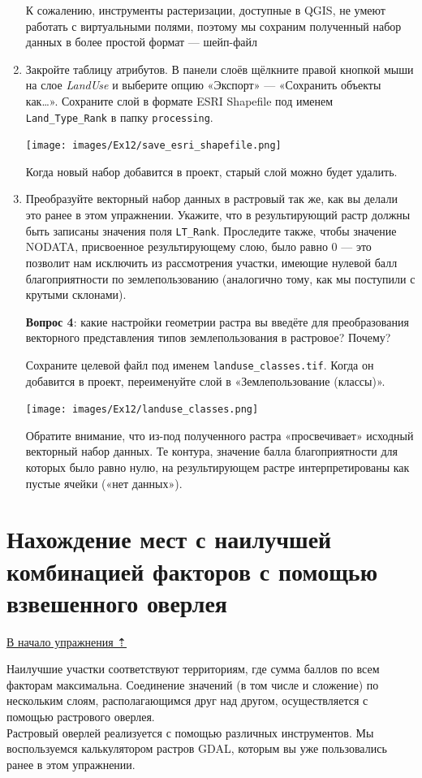 \documentclass[
  12pt,
]{book}
\begin{document}
\begin{enumerate}
  К сожалению, инструменты растеризации, доступные в QGIS, не умеют работать с виртуальными полями, поэтому мы сохраним полученный набор данных в более простой формат --- шейп-файл
\item
  Закройте таблицу атрибутов. В панели слоёв щёлкните правой кнопкой мыши на слое \emph{LandUse} и выберите опцию «Экспорт» --- «Сохранить объекты как\ldots». Сохраните слой в формате ESRI Shapefile под именем \texttt{Land\_Type\_Rank} в папку \texttt{processing}.

  \texttt{[image: images/Ex12/save\_esri\_shapefile.png]}

  Когда новый набор добавится в проект, старый слой можно будет удалить.
\item
  Преобразуйте векторный набор данных в растровый так же, как вы делали это ранее в этом упражнении. Укажите, что в результирующий растр должны быть записаны значения поля \texttt{LT\_Rank}. Проследите также, чтобы значение NODATA, присвоенное результирующему слою, было равно 0 --- это позволит нам исключить из рассмотрения участки, имеющие нулевой балл благоприятности по землепользованию (аналогично тому, как мы поступили с крутыми склонами).

  \textbf{Вопрос 4}: какие настройки геометрии растра вы введёте для преобразования векторного представления типов землепользования в растровое? Почему?

  Сохраните целевой файл под именем \texttt{landuse\_classes.tif}. Когда он добавится в проект, переименуйте слой в «Землепользование (классы)».

  \texttt{[image: images/Ex12/landuse\_classes.png]}

  Обратите внимание, что из-под полученного растра «просвечивает» исходный векторный набор данных. Те контура, значение балла благоприятности для которых было равно нулю, на результирующем растре интерпретированы как пустые ячейки («нет данных»).
\end{enumerate}

\hypertarget{weighted-overlay-combination}{%
\section{Нахождение мест с наилучшей комбинацией факторов с помощью взвешенного оверлея}\label{weighted-overlay-combination}}

\protect\hyperlink{weighted-overlay}{В начало упражнения ⇡}

Наилучшие участки соответствуют территориям, где сумма баллов по всем факторам максимальна. Соединение значений (в том числе и сложение) по нескольким слоям, располагающимся друг над другом, осуществляется с помощью растрового оверлея.\\
Растровый оверлей реализуется с помощью различных инструментов. Мы воспользуемся калькулятором растров GDAL, которым вы уже пользовались ранее в этом упражнении.
\end{document}
